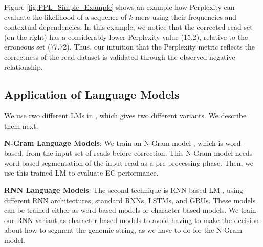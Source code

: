 Figure \ref{fig:PPL_Simple_Example} shows an example how Perplexity can evaluate the likelihood of a sequence of $k$-mers using their frequencies and contextual dependencies. In this example, we notice that the corrected read set (\ie on the right) has a considerably lower Perplexity value (15.2), relative to the erroneous set (77.72). Thus, our intuition that the Perplexity metric reflects the correctness of the read dataset is validated through the observed negative relationship.


\subsection{Application of Language Models}
We use two different LMs in \name, which gives two different variants. We describe them next.

\noindent \textbf{N-Gram Language Models}: %
We train an N-Gram model \cite{brown1992class}, which is word-based, from the input set of reads before correction. This N-Gram model needs word-based segmentation of the input read as a pre-processing phase. Then, we use this trained LM to evaluate EC performance.

\noindent \textbf{RNN Language Models}: The second technique is RNN-based LM \cite{kombrink2011recurrent}, using different RNN architectures, \eg standard RNNs, LSTMs, and GRUs.
These models can be trained either as word-based models or character-based models. We train our RNN variant as character-based models to avoid having to make the decision about how to segment the genomic string, as we have to do for the N-Gram model.


